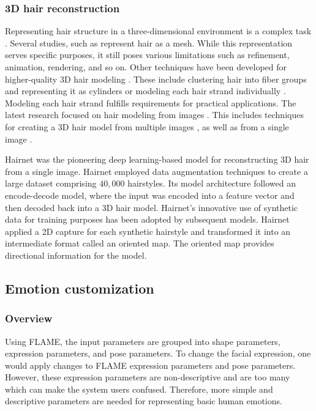 
\subsubsection{3D hair reconstruction}
Representing hair structure in a three-dimensional environment is a complex task \cite{hairsurvey}. Several studies, such as \cite{retinaface,facegcn,pifu,3dhmr} represent hair as a mesh. While this representation serves specific purposes, it still poses various limitations such as refinement, animation, rendering, and so on.
Other techniques have been developed for higher-quality 3D hair modeling \cite{hairsurvey}. These include clustering hair into fiber groups and representing it as cylinders \cite{cluster} or modeling each hair strand individually \cite{hairsurvey}. Modeling each hair strand fulfills requirements for practical applications.
The latest research focused on hair modeling from images \cite{imgbasesurvey}. This includes techniques for creating a 3D hair model from multiple images \cite{multihair1}, as well as from a single image \cite{hairimg1,hairimg2,hairimg4}.



Hairnet \cite{zhouHairNetSingleViewHair2018} was the pioneering deep learning-based model for reconstructing 3D hair from a single image. Hairnet employed data augmentation techniques to create a large dataset comprising $40,000$ hairstyles. Its model architecture followed an encode-decode model, where the input was encoded into a feature vector and then decoded back into a 3D hair model. Hairnet's innovative use of synthetic data for training purposes has been adopted by subsequent models. Hairnet applied a 2D capture for each synthetic hairstyle and transformed it into an intermediate format called an oriented map. The oriented map provides directional information for the model.

\subsection{Emotion customization}

\subsubsection{Overview}

Using FLAME, the input parameters are grouped into shape parameters, expression parameters, and pose parameters. To change the facial expression, one would apply changes to FLAME expression parameters and pose parameters. However, these expression parameters are non-descriptive and are too many which can make the system users confused. Therefore, more simple and descriptive parameters are needed for representing basic human emotions.

